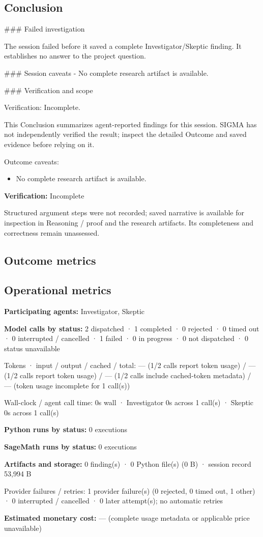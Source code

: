 \documentclass[11pt]{article}
\begin{document}
\subsection{Conclusion}
\#\#\# Failed investigation

The session failed before it saved a complete Investigator/Skeptic finding. It establishes no answer to the project question.

\#\#\# Session caveats
- No complete research artifact is available.

\#\#\# Verification and scope

Verification: Incomplete.

This Conclusion summarizes agent-reported findings for this session. SIGMA has not independently verified the result; inspect the detailed Outcome and saved evidence before relying on it.\par
Outcome caveats:\par
\begin{itemize}
\item No complete research artifact is available.
\end{itemize}
\textbf{Verification:} Incomplete\par
Structured argument steps were not recorded; saved narrative is available for inspection in Reasoning / proof and the research artifacts. Its completeness and correctness remain unassessed.\par
\subsection{Outcome metrics}
\subsection{Operational metrics}
\textbf{Participating agents:} Investigator, Skeptic\par
\textbf{Model calls by status:} 2 dispatched · 1 completed · 0 rejected · 0 timed out · 0 interrupted / cancelled · 1 failed · 0 in progress · 0 not dispatched · 0 status unavailable\par
Tokens · input / output / cached / total: — (1/2 calls report token usage) / — (1/2 calls report token usage) / — (1/2 calls include cached-token metadata) / — (token usage incomplete for 1 call(s))\par
Wall-clock / agent call time: 0s wall · Investigator 0s across 1 call(s) · Skeptic 0s across 1 call(s)\par
\textbf{Python runs by status:} 0 executions\par
\textbf{SageMath runs by status:} 0 executions\par
\textbf{Artifacts and storage:} 0 finding(s) · 0 Python file(s) (0 B) · session record 53,994 B\par
Provider failures / retries: 1 provider failure(s) (0 rejected, 0 timed out, 1 other) · 0 interrupted / cancelled · 0 later attempt(s); no automatic retries\par
\textbf{Estimated monetary cost:} — (complete usage metadata or applicable price unavailable)\par
\end{document}
